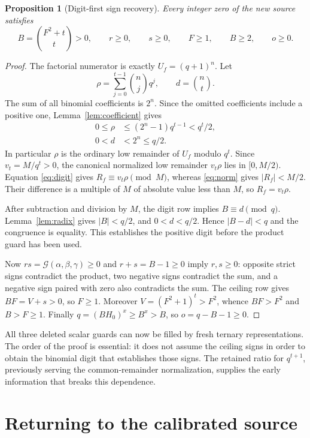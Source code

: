 \documentclass[11pt,letterpaper]{article}
\newtheorem{proposition}[theorem]{Proposition}
\newcommand{\G}{\mathcal G}
\begin{document}
\begin{proposition}[Digit-first sign recovery]\label{prop:digit}
Every integer zero of the new source satisfies
\[
 B=\binom{F^2+t}{t}>0,\qquad r\ge0,\qquad s\ge0,\qquad
 F\ge1,\qquad B\ge2,\qquad o\ge0.
\]
\end{proposition}
\begin{proof}
The factorial numerator is exactly $U_f=(q+1)^n$.
Let
\[
 \rho=\sum_{j=0}^{t-1}\binom njq^j,\qquad d=\binom nt.
\]
The sum of all binomial coefficients is $2^n$. Since the omitted
coefficients include a positive one, Lemma~\ref{lem:coefficient} gives
\begin{align*}
 0\le\rho
   &\le(2^n-1)q^{t-1}<q^t/2,\\
 0<d&<2^n\le q/2.
\end{align*}
In particular $\rho$ is the ordinary low remainder of $U_f$ modulo
$q^t$. Since $v_t=M/q^t>0$, the canonical normalized low remainder
$v_t\rho$ lies in $[0,M/2)$. Equation \eqref{eq:digit} gives
$R_f\equiv v_t\rho\pmod M$, whereas \eqref{eq:norm} gives
$|R_f|<M/2$. Their difference is a multiple of $M$ of absolute
value less than $M$, so $R_f=v_t\rho$.

After subtraction and division by $M$, the digit row implies
$B\equiv d\pmod q$. Lemma~\ref{lem:radix} gives $|B|<q/2$,
and $0<d<q/2$. Hence $|B-d|<q$ and the congruence is equality.
This establishes the positive digit before the product guard has
been used.

Now $rs=\G(\alpha,\beta,\gamma)\ge0$ and $r+s=B-1\ge0$ imply
$r,s\ge0$: opposite strict signs contradict the product, two
negative signs contradict the sum, and a negative sign paired with
zero also contradicts the sum. The ceiling row gives
$BF=V+s>0$, so $F\ge1$. Moreover $V=(F^2+1)^t>F^2$,
whence $BF>F^2$ and $B>F\ge1$.
Finally $q=(BH_0)^x\ge B^x>B$, so
$o=q-B-1\ge0$.
\end{proof}

All three deleted scalar guards can now be filled by fresh ternary
representations. The order of the proof is essential: it does not
assume the ceiling signs in order to obtain the binomial digit that
establishes those signs. The retained ratio for $q^{t+1}$, previously
serving the common-remainder normalization, supplies the early
information that breaks this dependence.

\section{Returning to the calibrated source}
\label{sec:factorial}
\end{document}
